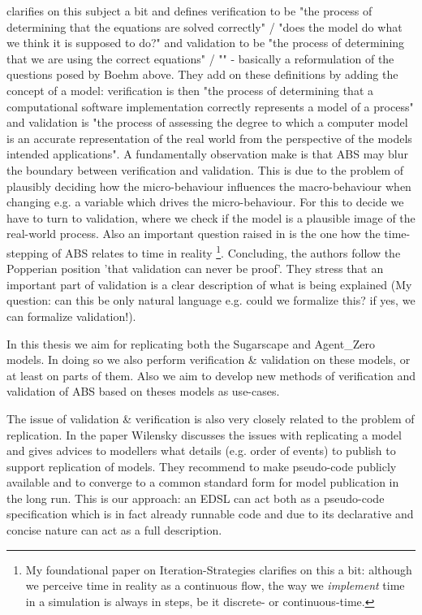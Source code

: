 \cite{ormerod_epistemological_2009} clarifies on this subject a bit and defines verification to be "the process of determining that the equations are solved correctly" / "does the model do what we think it is supposed to do?" and validation to be "the process of determining that we are using the correct equations" / "" - basically a reformulation of the questions posed by Boehm \cite{boehm_software_1989} above. They add on these definitions by adding the concept of a model: verification is then "the process of determining that a computational software implementation correctly represents a model of a process" and validation is "the process of assessing the degree to which a computer model is an accurate representation of the real world from the perspective of the models intended applications".
A fundamentally observation \cite{ormerod_epistemological_2009} make is that ABS may blur the boundary between verification and validation. This is due to the problem of plausibly deciding how the micro-behaviour influences the macro-behaviour when changing e.g. a variable which drives the micro-behaviour. For this to decide we have to turn to validation, where we check if the model is a plausible image of the real-world process.
Also an important question raised in \cite{ormerod_epistemological_2009} is the one how the time-stepping of ABS relates to time in reality \footnote{My foundational paper on Iteration-Strategies clarifies on this a bit: although we perceive time in reality as a continuous flow, the way we \textit{implement} time in a simulation is always in steps, be it discrete- or continuous-time.}. Concluding, the authors follow the Popperian position 'that validation can never be proof'. They stress that an important part of validation is a clear description of what is being explained (My question: can this be only natural language e.g. could we formalize this? if yes, we can formalize validation!).

In this thesis we aim for replicating both the Sugarscape \cite{epstein_growing_1996} and Agent\_Zero \cite{epstein_agent_zero:_2014} models. In doing so we also perform verification \& validation on these models, or at least on parts of them. Also we aim to develop new methods of verification and validation of ABS based on theses models as use-cases. 

The issue of validation \& verification is also very closely related to the problem of replication. In the paper \cite{wilensky_making_2007} Wilensky discusses the issues with replicating a model and gives advices to modellers what details (e.g. order of events) to publish to support replication of models. They recommend to make pseudo-code publicly available and to converge to a common standard form for model publication in the long run. This is our approach: an EDSL can act both as a pseudo-code specification which is in fact already runnable code and due to its declarative and concise nature can act as a full description.
 
